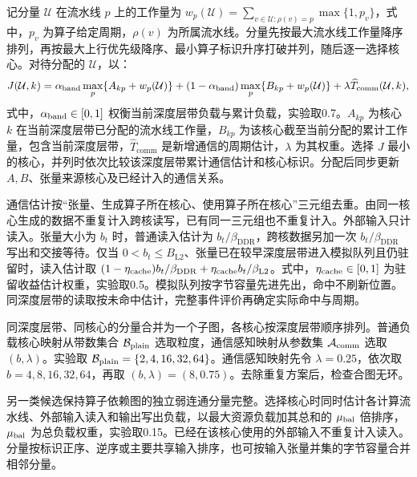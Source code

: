 记分量 $\mathcal U$ 在流水线 $p$ 上的工作量为 $w_p(\mathcal U)=\sum_{v\in\mathcal U:\rho(v)=p}\max\{1,p_v\}$，式中，$p_v$ 为算子给定周期，$\rho(v)$ 为所属流水线。分量先按最大流水线工作量降序排列，再按最大上行优先级降序、最小算子标识升序打破并列，随后逐一选择核心。对待分配的 $\mathcal U$，以：
\begin{equation}
 J(\mathcal U,k)=\alpha_{\rm band}\max_p\{A_{kp}+w_p(\mathcal U)\}
       +(1-\alpha_{\rm band})\max_p\{B_{kp}+w_p(\mathcal U)\}
       +\lambda\widehat T_{\mathrm{comm}}(\mathcal U,k),
 \label{eq:q3_band_score}
\end{equation}
\noindent 式中，$\alpha_{\rm band}\in[0,1]$ 权衡当前深度层带负载与累计负载，实验取0.7。$A_{kp}$ 为核心 $k$ 在当前深度层带已分配的流水线工作量，$B_{kp}$ 为该核心截至当前分配的累计工作量，包含当前深度层带，$\widehat T_{\mathrm{comm}}$ 是新增通信的周期估计，$\lambda$ 为其权重。选择 $J$ 最小的核心，并列时依次比较该深度层带累计通信估计和核心标识。分配后同步更新 $A,B$、张量来源核心及已经计入的通信关系。

通信估计按“张量、生成算子所在核心、使用算子所在核心”三元组去重。由同一核心生成的数据不重复计入跨核读写，已有同一三元组也不重复计入。外部输入只计读入。张量大小为 $b_t$ 时，普通读入估计为 $b_t/\beta_{\mathrm{DDR}}$，跨核数据另加一次 $b_t/\beta_{\mathrm{DDR}}$ 写出和交接等待。仅当 $0<b_t\le B_{\mathrm{L2}}$、张量已在较早深度层带进入模拟队列且仍驻留时，读入估计取 $(1-\eta_{\rm cache})b_t/\beta_{\mathrm{DDR}}+\eta_{\rm cache}b_t/\beta_{\mathrm{L2}}$。式中，$\eta_{\rm cache}\in[0,1]$ 为驻留收益估计权重，实验取0.5。模拟队列按字节容量先进先出，命中不刷新位置。同深度层带的读取按未命中估计，完整事件评价再确定实际命中与周期。

同深度层带、同核心的分量合并为一个子图，各核心按深度层带顺序排列。普通负载核心映射从带数集合 $\mathcal B_{\rm plain}$ 选取粒度，通信感知映射从参数集 $\mathcal A_{\rm comm}$ 选取 $(b,\lambda)$。实验取 $\mathcal B_{\rm plain}=\{2,4,16,32,64\}$。通信感知映射先令 $\lambda=0.25$，依次取 $b=4,8,16,32,64$，再取 $(b,\lambda)=(8,0.75)$。去除重复方案后，检查合图无环。

另一类候选保持算子依赖图的独立弱连通分量完整。选择核心时同时估计各计算流水线、外部输入读入和输出写出负载，以最大资源负载加其总和的 $\mu_{\rm bal}$ 倍排序，$\mu_{\rm bal}$ 为总负载权重，实验取0.15。已经在该核心使用的外部输入不重复计入读入。分量按标识正序、逆序或主要共享输入排序，也可按输入张量并集的字节容量合并相邻分量。

